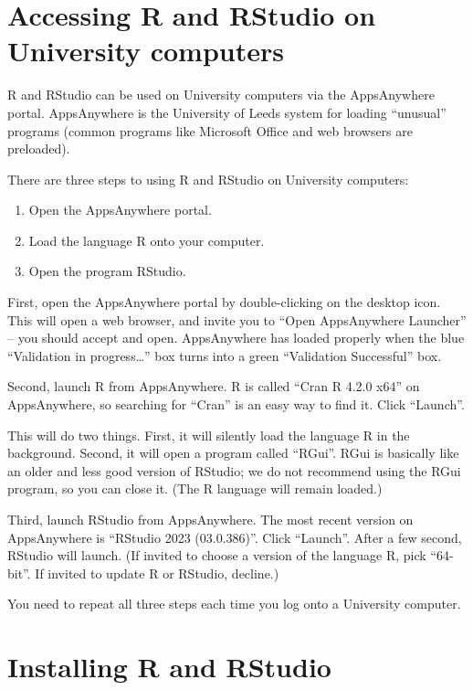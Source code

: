 \documentclass[
  a4paper,
]{book}
\providecommand{\tightlist}{%
  \setlength{\itemsep}{0pt}\setlength{\parskip}{0pt}}
\theoremstyle{definition}
\theoremstyle{definition}
\theoremstyle{definition}
\theoremstyle{definition}
\theoremstyle{remark}
\begin{document}
\hypertarget{r-uni}{%
\section*{Accessing R and RStudio on University computers}\label{r-uni}}

R and RStudio can be used on University computers via the AppsAnywhere portal. AppsAnywhere is the University of Leeds system for loading ``unusual'' programs (common programs like Microsoft Office and web browsers are preloaded).

There are three steps to using R and RStudio on University computers:

\begin{enumerate}
\def\labelenumi{\arabic{enumi}.}
\tightlist
\item
  Open the AppsAnywhere portal.
\item
  Load the language R onto your computer.
\item
  Open the program RStudio.
\end{enumerate}

First, open the AppsAnywhere portal by double-clicking on the desktop icon. This will open a web browser, and invite you to ``Open AppsAnywhere Launcher'' -- you should accept and open. AppsAnywhere has loaded properly when the blue ``Validation in progress\ldots{}'' box turns into a green ``Validation Successful'' box.

Second, launch R from AppsAnywhere. R is called ``Cran R 4.2.0 x64'' on AppsAnywhere, so searching for ``Cran'' is an easy way to find it. Click ``Launch''.

This will do two things. First, it will silently load the language R in the background. Second, it will open a program called ``RGui''. RGui is basically like an older and less good version of RStudio; we do not recommend using the RGui program, so you can close it. (The R language will remain loaded.)

Third, launch RStudio from AppsAnywhere. The most recent version on AppsAnywhere is ``RStudio 2023 (03.0.386)''. Click ``Launch''. After a few second, RStudio will launch. (If invited to choose a version of the language R, pick ``64-bit''. If invited to update R or RStudio, decline.)

You need to repeat all three steps each time you log onto a University computer.

\hypertarget{r-install}{%
\section*{Installing R and RStudio}\label{r-install}}
\end{document}
